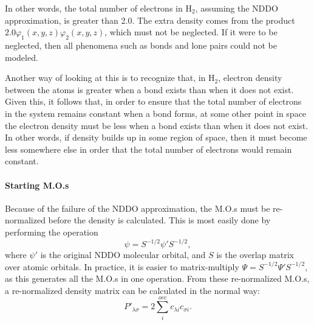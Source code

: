 In other words, the total number of electrons in H$_2$, assuming the NDDO
approximation,  is greater than 2.0.  The extra density comes from the product
$ 2.0\varphi_1(x,y,z)\varphi_2(x,y,z)$, which must not be neglected.  If it
were to be neglected, then all phenomena such as bonds and lone pairs could not
be modeled.

Another way of looking at this is to recognize that, in H$_2$, electron density
between the atoms is greater when a bond exists than when it does not exist.
Given this, it follows that, in order to ensure that the total number of
electrons in the system remains constant when a bond forms, at some other point
in space the electron density must be less when a bond exists than when it does
not exist.  In other words, if density builds up in some region of space, then
it must become less somewhere else in order that the total number of electrons
would remain constant.

\paragraph*{Starting M.O.s}

Because of the failure of the NDDO approximation, the M.O.s must be re-normalized
before the density is calculated.  This is most easily done by performing the
operation
$$
  \psi = S^{-1/2}\psi'S^{-1/2},
$$
where $\psi'$ is the original NDDO molecular orbital, and $S$ is the overlap matrix over atomic orbitals.
In practice, it is easier to matrix-multiply $\Psi =  S^{-1/2}\Psi'S^{-1/2}
$, as this generates all the M.O.s in one operation.
From these re-normalized M.O.s, a re-normalized density matrix can
be calculated in the normal way:
$$
 P'_{\lambda\sigma}=2\sum_i^{occ}c_{\lambda i} c_{\sigma i}.
$$
